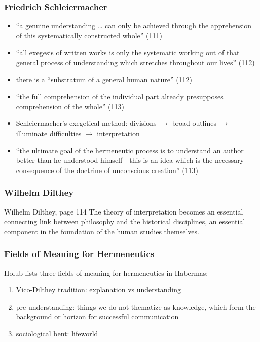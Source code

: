 \documentclass[xcolor=dvipsnames]{beamer}
\begin{document}
\begin{frame}
  \frametitle{Friedrich Schleiermacher}
  \begin{itemize}
  \item ``a genuine understanding {\ldots} can only be achieved
    through the apprehension of this systematically constructed
    whole'' (111)
  \item ``all exegesis of written works is only the systematic working
    out of that general process of understanding which stretches
    throughout our lives'' (112)
  \item there is a ``substratum of a general human nature'' (112)
  \item ``the full comprehension of the individual part already
	    presupposes comprehension of the whole'' (113)
  \item Schleiermacher's exegetical method: divisions
    $\longrightarrow$ broad outlines $\longrightarrow$ illuminate
    difficulties $\longrightarrow$ interpretation
  \item ``the ultimate goal of the hermeneutic process is to
    understand an author better than he understood himself---this is
    an idea which is the necessary consequence of the doctrine of
    unconscious creation'' (113)
  \end{itemize}
\end{frame}

\begin{frame}
  \frametitle{Wilhelm Dilthey}
  \begin{block}{Wilhelm Dilthey, page 114}
    The theory of interpretation becomes an essential connecting link
    between philosophy and the historical disciplines, an essential
    component in the foundation of the human studies themselves.
  \end{block}
\end{frame}

\begin{frame}
  \frametitle{Fields of Meaning for Hermeneutics}
  Holub lists three fields of meaning for hermeneutics in Habermas:
  \begin{enumerate}
  \item Vico-Dilthey tradition: explanation vs understanding
  \item pre-understanding: things we do not thematize as knowledge,
    which form the background or horizon for successful communication
  \item sociological bent: lifeworld
  \end{enumerate}
\end{frame}
\end{document}
